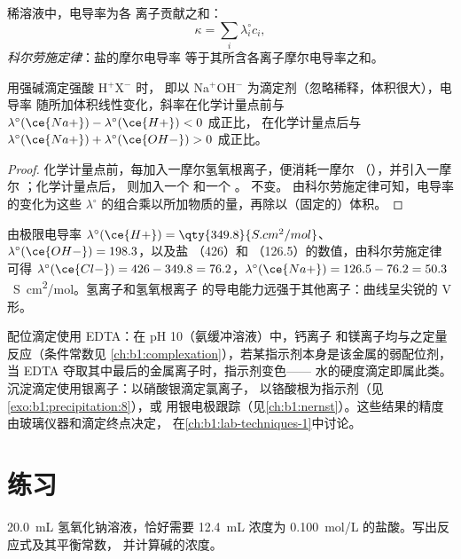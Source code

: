 \begin{proposition}[科尔劳施定律]\label{prop:b1:titration-methods:kohlrausch}
稀溶液中，电导率为各
离子贡献之和：
\[
  \kappa = \sum_i \lambda_i^\circ c_i ,
\]
\emph{科尔劳施定律}：盐的摩尔电导率
等于其所含各离子摩尔电导率之和。
\end{proposition}


\begin{proposition}[电导滴定的斜率]\label{prop:b1:titration-methods:conductimetric-slopes}
用强碱滴定强酸 H$^+$X$^-$ 时，
即以 Na$^+$OH$^-$ 为滴定剂（忽略稀释，体积很大），电导率
随所加体积线性变化，斜率在化学计量点前与
$\lambda^\circ(\ce{Na+}) - \lambda^\circ(\ce{H+}) < 0$ 成正比，
在化学计量点后与 $\lambda^\circ(\ce{Na+}) + \lambda^\circ(\ce{OH-}) > 0$
成正比。
\end{proposition}

\begin{proof}
化学计量点前，每加入一摩尔氢氧根离子，便消耗一摩尔
（），并引入一摩尔 ；化学计量点后，
则加入一个  和一个 。 不变。
由科尔劳施定律可知，电导率的变化为这些
$\lambda^\circ$ 的组合乘以所加物质的量，再除以（固定的）体积。
\end{proof}

由极限电导率 $\lambda^\circ(\ce{H+}) =
\qty{349.8}{S.cm^2/mol}$、$\lambda^\circ(\ce{OH-}) = 198.3$，以及盐
（426）和 （126.5）的数值，由科尔劳施定律可得
$\lambda^\circ(\ce{Cl-}) = 426 - 349.8 = 76.2$，$\lambda^\circ(\ce{Na+}) =
126.5 - 76.2 = 50.3$~\unit{S.cm^2/mol}。氢离子和氢氧根离子
的导电能力远强于其他离子：曲线呈尖锐的 V 形。

配位滴定使用 EDTA：在 pH 10（氨缓冲溶液）中，钙离子
和镁离子均与之定量反应（条件常数见
\cref{ch:b1:complexation}），若某指示剂本身是该金属的弱配位剂，
当 EDTA 夺取其中最后的金属离子时，指示剂变色——
水的硬度滴定即属此类。
沉淀滴定使用银离子：以硝酸银滴定氯离子，
以铬酸根为指示剂（见\cref{exo:b1:precipitation:8}），或
用银电极跟踪（见\cref{ch:b1:nernst}）。这些结果的精度
由玻璃仪器和滴定终点决定，
在\cref{ch:b1:lab-techniques-1}中讨论。

\section{练习}

\begin{exercise}[$\star$]\label{exo:b1:titration-methods:1}
\qty{20.0}{mL} 氢氧化钠溶液，恰好需要 \qty{12.4}{mL}
浓度为 \qty{0.100}{mol/L} 的盐酸。写出反应式及其平衡常数，
并计算碱的浓度。
\end{exercise}

